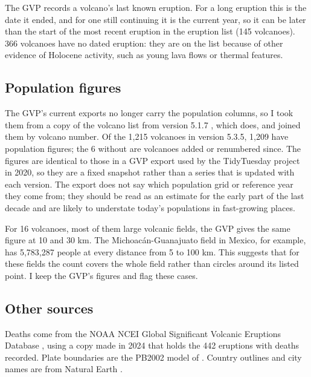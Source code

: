 \documentclass[11pt,a4paper]{article}
\begin{document}
The GVP records a volcano's last known eruption. For a long eruption this is the date it ended, and for one still continuing it is the current year, so it can be later than the start of the most recent eruption in the eruption list (145 volcanoes). 366 volcanoes have no dated eruption: they are on the list because of other evidence of Holocene activity, such as young lava flows or thermal features.

\subsection{Population figures}
The GVP's current exports no longer carry the population columns, so I took them from a copy of the volcano list from version 5.1.7 \citep{gvp517}, which does, and joined them by volcano number. Of the 1,215 volcanoes in version 5.3.5, 1,209 have population figures; the 6 without are volcanoes added or renumbered since. The figures are identical to those in a GVP export used by the TidyTuesday project in 2020, so they are a fixed snapshot rather than a series that is updated with each version. The export does not say which population grid or reference year they come from; they should be read as an estimate for the early part of the last decade and are likely to understate today's populations in fast-growing places.

For 16 volcanoes, most of them large volcanic fields, the GVP gives the same figure at 10 and 30 km. The Michoac\'an-Guanajuato field in Mexico, for example, has 5,783,287 people at every distance from 5 to 100 km. This suggests that for these fields the count covers the whole field rather than circles around its listed point. I keep the GVP's figures and flag these cases.

\subsection{Other sources}
Deaths come from the NOAA NCEI Global Significant Volcanic Eruptions Database \citep{ncei}, using a copy made in 2024 that holds the 442 eruptions with deaths recorded. Plate boundaries are the PB2002 model of \citet{bird2003}. Country outlines and city names are from Natural Earth \citep{naturalearth}.
\end{document}
